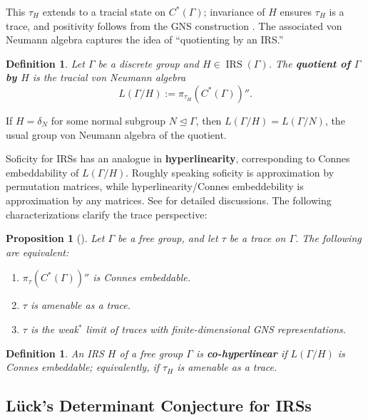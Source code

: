 \documentclass[pdflatex,sn-mathphys-num]{sn-jnl}%
\newtheorem{proposition}[theorem]{Proposition}
\newtheorem{definition}[theorem]{Definition}
\newcommand{\IRS}{\operatorname{IRS}}
\begin{document}
This $\tau_H$ extends to a tracial state on $C^*(\Gamma)$; invariance of $H$ ensures $\tau_H$ is a trace, and positivity follows from the GNS construction \cite[Proposition~2.11]{manzoor_there_2025}.  
The associated von Neumann algebra captures the idea of ``quotienting by an IRS.''

\begin{definition}\label{def:1.11}
    Let $\Gamma$ be a discrete group and $H \in \IRS(\Gamma)$.  
    The \textbf{quotient of $\Gamma$ by $H$} is the tracial von Neumann algebra
    \[
        L(\Gamma/H) := \pi_{\tau_H}(C^*(\Gamma))''.
    \]
\end{definition}

If $H = \delta_N$ for some normal subgroup $N \trianglelefteq \Gamma$, then $L(\Gamma/H) = L(\Gamma/N)$, the usual group von Neumann algebra of the quotient.

\medskip

Soficity for IRSs has an analogue in \textbf{hyperlinearity}, corresponding to Connes embeddability of $L(\Gamma/H)$. Roughly speaking soficity is approximation by permutation matrices, while hyperlinearity/Connes embeddebility is approximation by any matrices. See \cite[Section 2.2]{manzoor_there_2025} for detailed discussions.
The following characterizations clarify the trace perspective:

\begin{proposition}[\cite{brown_invariant_2006}]
    Let $\Gamma$ be a free group, and let $\tau$ be a trace on $\Gamma$.  
    The following are equivalent:
    \begin{enumerate}
        \item $\pi_\tau(C^*(\Gamma))''$ is Connes embeddable.
        \item $\tau$ is amenable as a trace.
        \item $\tau$ is the weak$^*$ limit of traces with finite-dimensional GNS representations.
    \end{enumerate}
\end{proposition}

\begin{definition}
    An IRS $H$ of a free group $\Gamma$ is \textbf{co-hyperlinear} if $L(\Gamma/H)$ is Connes embeddable; equivalently, if $\tau_H$ is amenable as a trace.
\end{definition}



\subsection{L\"uck's Determinant Conjecture for IRSs}
\end{document}
